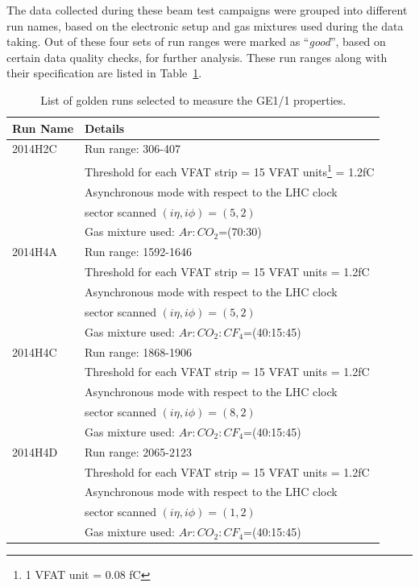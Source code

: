The data collected during these beam test campaigns were grouped into different run names, based on the electronic setup and gas mixtures used during the data taking.
Out of these four sets of run ranges were marked as ``\textit{good}'', based on certain data quality checks, for further analysis. These run ranges along with their specification are listed in Table~\ref{tab:gemTBgoldenruns}.
\begin{table}
\centering
{\footnotesize
\begin{tabular}[!htbp]{l l}
\hline
\textbf{Run Name}   &   \textbf{Details}\\
\hline
2014H2C     & Run range: 306-407    \\
            & Threshold for each VFAT strip = 15 VFAT units\footnote{1 VFAT unit = 0.08 fC} = 1.2fC\\
            & Asynchronous mode with respect to the LHC clock \\
            & sector scanned $(i\eta, i\phi)=(5,2)$\\
            & Gas mixture used: $Ar:CO_{2}$=(70:30)\\
\hline
2014H4A     & Run range: 1592-1646 \\
            & Threshold for each VFAT strip = 15 VFAT units = 1.2fC\\
            & Asynchronous mode with respect to the LHC clock \\
            & sector scanned $(i\eta, i\phi)=(5,2)$\\
            & Gas mixture used: $Ar:CO_{2}:CF_4$=(40:15:45)\\
\hline
2014H4C     & Run range: 1868-1906 \\
            & Threshold for each VFAT strip = 15 VFAT units = 1.2fC\\
            & Asynchronous mode with respect to the LHC clock \\
            & sector scanned $(i\eta, i\phi)=(8,2)$\\
            & Gas mixture used: $Ar:CO_{2}:CF_4$=(40:15:45)\\
\hline
2014H4D     & Run range: 2065-2123 \\
            & Threshold for each VFAT strip = 15 VFAT units = 1.2fC\\
            & Asynchronous mode with respect to the LHC clock \\
            & sector scanned $(i\eta, i\phi)=(1,2)$\\             
            & Gas mixture used: $Ar:CO_{2}:CF_4$=(40:15:45)\\
\hline
\end{tabular}
\caption{List of golden runs selected to measure the GE1/1 properties.}
\label{tab:gemTBgoldenruns}
}
\end{table}

